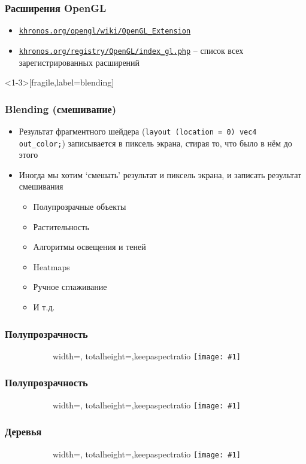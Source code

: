 \documentclass{beamer}
\newcommand{\slideimage}[1]{
  \begin{figure}
    \begin{adjustbox}{width=\textwidth, totalheight=\textheight-2\baselineskip-2\baselineskip,keepaspectratio}
      \texttt{[image: \#1]}
    \end{adjustbox}
  \end{figure}
}
\begin{document}
\begin{frame}[fragile]
\frametitle{Расширения OpenGL}
\begin{itemize}
\item \href{https://www.khronos.org/opengl/wiki/OpenGL_Extension}{\nolinkurl{khronos.org/opengl/wiki/OpenGL\_Extension}}
\item \href{https://www.khronos.org/registry/OpenGL/index_gl.php}{\nolinkurl{khronos.org/registry/OpenGL/index\_gl.php}} -- список всех зарегистрированных расширений
\end{itemize}
\end{frame}

\begin{frame}<1-3>[fragile,label=blending]
\frametitle{Blending (смешивание)}
\begin{itemize}
\item Результат фрагментного шейдера (\verb|layout (location = 0) vec4 out_color;|) записывается в пиксель экрана, стирая то, что было в нём до этого
\pause
\item Иногда мы хотим `смешать' результат и пиксель экрана, и записать результат смешивания
\pause
\begin{itemize}
\item Полупрозрачные объекты
\pause
\item Растительность
\pause
\item Алгоритмы освещения и теней
\pause
\item Heatmaps
\pause
\item Ручное сглаживание
\pause
\item И т.д.
\end{itemize}
\end{itemize}
\end{frame}

\begin{frame}
\frametitle{Полупрозрачность}
\begin{figure}
\slideimage{window.png}
\end{figure}
\end{frame}

\begin{frame}
\frametitle{Полупрозрачность}
\begin{figure}
\slideimage{macos-ui.png}
\end{figure}
\end{frame}


\begin{frame}
\frametitle{Деревья}
\begin{figure}
\slideimage{birch.png}
\end{figure}
\end{frame}
\end{document}
